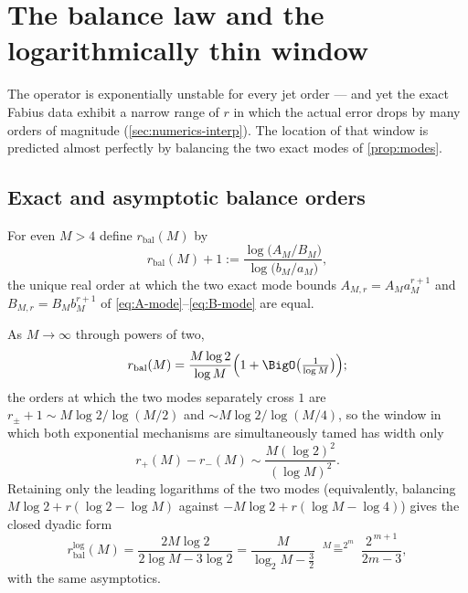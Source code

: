 \documentclass[11pt,oneside]{article}
\numberwithin{equation}{section}
\theoremstyle{definition}
\theoremstyle{remark}
\begin{document}
\section{The balance law and the logarithmically thin window}
\label{sec:balance}

The operator is exponentially unstable for every jet order --- and yet
the exact Fabius data exhibit a narrow range of $r$ in which the
actual error drops by many orders of magnitude
(\cref{sec:numerics-interp}).  The location of that window is
predicted almost perfectly by balancing the two exact modes of
\cref{prop:modes}.

\subsection{Exact and asymptotic balance orders}

\begin{definition}
\label{def:balance}
For even $M>4$ define $r_{\mathrm{bal}}(M)$ by
\begin{equation}
 r_{\mathrm{bal}}(M)+1
 :=\frac{\log\bigl(A_M/B_M\bigr)}{\log\bigl(b_M/a_M\bigr)},
 \label{eq:balance-exact}
\end{equation}
the unique real order at which the two exact mode bounds
$A_{M,r}=A_Ma_M^{r+1}$ and $B_{M,r}=B_Mb_M^{r+1}$ of
\eqref{eq:A-mode}--\eqref{eq:B-mode} are equal.
\end{definition}

\begin{proposition}
\label{prop:balance-asymptotic}
As $M\to\infty$ through powers of two,
\begin{equation}
 r_{\mathrm{bal}}(M)
 =\frac{M\log2}{\log M}
 \Bigl(1+\BigO\bigl(\tfrac1{\log M}\bigr)\Bigr);
 \label{eq:balance-asymptotic}
\end{equation}
the orders at which the two modes separately cross $1$ are
$r_\pm+1\sim M\log2/\log(M/2)$ and $\sim M\log2/\log(M/4)$, so the
window in which both exponential mechanisms are simultaneously tamed
has width only
\begin{equation}
 r_+(M)-r_-(M)\sim\frac{M(\log2)^{2}}{(\log M)^{2}}.
 \label{eq:window-width}
\end{equation}
Retaining only the leading logarithms of the two modes
(equivalently, balancing $M\log2+r(\log2-\log M)$ against
$-M\log2+r(\log M-\log4)$) gives the closed dyadic form
\begin{equation}
 r_{\mathrm{bal}}^{\log}(M)
 =\frac{2M\log2}{2\log M-3\log2}
 =\frac{M}{\log_2M-\tfrac32}
 \;\overset{M=2^{m}}{=}\;
 \frac{2^{\,m+1}}{2m-3},
 \label{eq:balance-log}
\end{equation}
with the same asymptotics.
\end{proposition}
\end{document}
